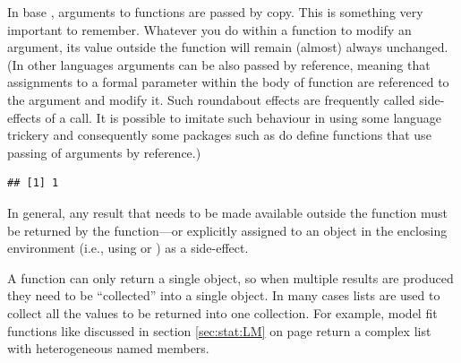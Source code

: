 \documentclass[krantz2]{krantz}\usepackage{knitr}%
\begin{document}
\begin{warningbox}
In base \Rlang, arguments to functions are passed by copy. This is something very important to remember. Whatever you do within a function to modify an argument, its value outside the function will remain (almost) always unchanged. (In other languages arguments can be also passed by reference, meaning that assignments to a formal parameter within the body of function are referenced to the argument and modify it. Such roundabout effects are frequently called side-effects of a call. It is possible to imitate such behaviour in \Rlang using some language trickery and consequently some packages such as  do define functions that use passing of arguments by reference.)

\begin{knitrout}\footnotesize
{}\color{fgcolor}\begin{kframe}
\begin{alltt}
 \hlkwb{<-} \hlstd{(} \hlkwb{<-} \hlstd{\}}
 \hlkwb{<-} 
\end{alltt}
\begin{verbatim}
## [1] 1
\end{verbatim}
\end{kframe}
\end{knitrout}

In general, any result that needs to be made available outside the function must be returned by the function---or explicitly assigned to an object in the enclosing environment (i.e., using \Roperator{<<-} or ) as a side-effect.

A function can only return a single object, so when multiple results are produced they need to be ``collected'' into a single object. In many cases lists are used to collect all the values to be returned into one collection. For example, model fit functions like  discussed in section \ref{sec:stat:LM} on page \pageref{sec:stat:LM} return a complex list with heterogeneous named members.
\end{warningbox}
\end{document}
